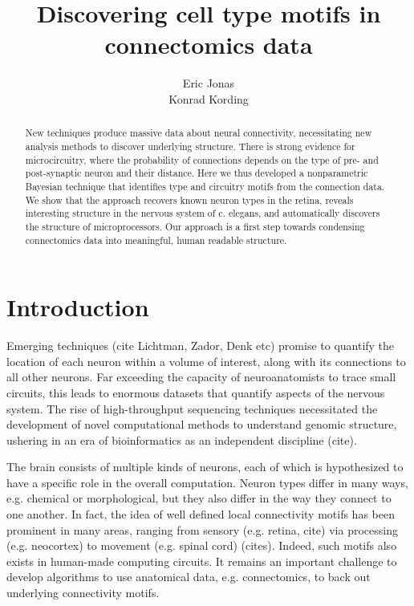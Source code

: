 \documentclass{article}
\title{Discovering cell type motifs in connectomics data}
\author{Eric Jonas \\ Konrad Kording}
\begin{document}
\maketitle

\listoftodos

\begin{abstract}
  New techniques produce massive data about neural connectivity,
  necessitating new analysis methods to discover underlying
  structure. There is strong evidence for microcircuitry, where the
  probability of connections depends on the type of pre- and
  post-synaptic neuron and their distance. Here we thus developed a
  nonparametric Bayesian technique that identifies type and circuitry
  motifs from the connection data. We show that the approach recovers
  known neuron types in the retina, reveals interesting structure in
  the nervous system of c. elegans, and automatically discovers the
  structure of microprocessors. Our approach is a first step towards
  condensing connectomics data into meaningful, human readable
  structure.
\end{abstract}

\section{Introduction}
Emerging techniques (cite Lichtman, Zador, Denk etc) promise to
quantify the location of each neuron within a volume of interest,
along with its connections to all other neurons. Far exceeding the
capacity of neuroanatomists to trace small circuits, this leads to
enormous datasets that quantify aspects of the nervous system. The
rise of high-throughput sequencing techniques necessitated the
development of novel computational methods to understand genomic
structure, ushering in an era of bioinformatics as an independent
discipline (cite).




The brain consists of multiple kinds of neurons, each of which is
hypothesized to have a specific role in the overall
computation. Neuron types differ in many ways, e.g. chemical or
morphological, but they also differ in the way they connect to one
another. In fact, the idea of well defined local connectivity motifs
has been prominent in many areas, ranging from sensory (e.g. retina,
cite) via processing (e.g. neocortex) to movement (e.g. spinal cord)
(cites). Indeed, such motifs also exists in human-made computing
circuits. It remains an important challenge to develop algorithms to
use anatomical data, e.g. connectomics, to back out underlying
connectivity motifs.
\end{document}

